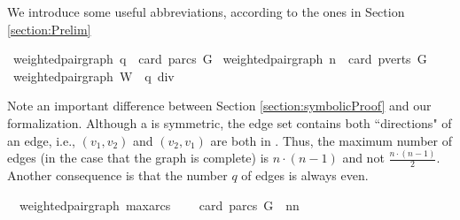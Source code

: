 \begin{isabellebody}
\begin{isamarkuptext}%
We introduce some useful abbreviations, according to the ones in Section \ref{section:Prelim}%
\end{isamarkuptext}\isamarkuptrue%
\isamarkupfalse%
{\isacharparenleft}\ weighted{\isacharunderscore}pair{\isacharunderscore}graph{\isacharparenright}\ {\isachardoublequoteopen}q\ {\isasymequiv}\ card\ {\isacharparenleft}parcs\ G{\isacharparenright}{\isachardoublequoteclose}\isanewline
{}\isamarkupfalse%
{\isacharparenleft}\ weighted{\isacharunderscore}pair{\isacharunderscore}graph{\isacharparenright}\ {\isachardoublequoteopen}n\ {\isasymequiv}\ card\ {\isacharparenleft}pverts\ G{\isacharparenright}{\isachardoublequoteclose}\isanewline
{}\isamarkupfalse%
{\isacharparenleft}\ weighted{\isacharunderscore}pair{\isacharunderscore}graph{\isacharparenright}\ {\isachardoublequoteopen}W\ {\isasymequiv}\ {\isacharbraceleft}{}{\isachardot}{\isachardot}q\ div\ {}{\isacharbraceright}{\isachardoublequoteclose}%
\begin{isamarkuptext}%
Note an important difference between Section \ref{section:symbolicProof} and our formalization. Although 
a  is symmetric, the edge set contains both ``directions" of an edge, 
i.e., $(v_1,v_2)$ and $(v_2,v_1)$ are both in . Thus, the maximum number of edges (in the 
case that the graph is complete) is $n\cdot(n-1)$ and not $\frac{n\cdot(n-1)}{2}$. Another consequence is that
the number $q$ of edges is always even.%
\end{isamarkuptext}\isamarkuptrue%
\isamarkupfalse%
\ {\isacharparenleft}\ weighted{\isacharunderscore}pair{\isacharunderscore}graph{\isacharparenright}\ max{\isacharunderscore}arcs{\isacharcolon}\ \isanewline
\ \ \ {\isachardoublequoteopen}card\ {\isacharparenleft}parcs\ G{\isacharparenright}\ {\isasymle}\ n{\isacharasterisk}{\isacharparenleft}n{\isacharminus}{}{\isacharparenright}{\isachardoublequoteclose}%
\isadelimproof
%
\endisadelimproof
%
\isatagproof
%
\endisatagproof
{\isafoldproof}%
%
\isadelimproof
%
\endisadelimproof
%
\isadelimproof
%
\endisadelimproof
%
\isatagproof
%
\endisatagproof
{\isafoldproof}%
%
\isadelimproof
%
\endisadelimproof
%
\isadelimproof
%
\endisadelimproof
%
\isatagproof
%
\endisatagproof
{\isafoldproof}%
%
\isadelimproof
%
\endisadelimproof
%
\isadelimproof

\end{isabellebody}
